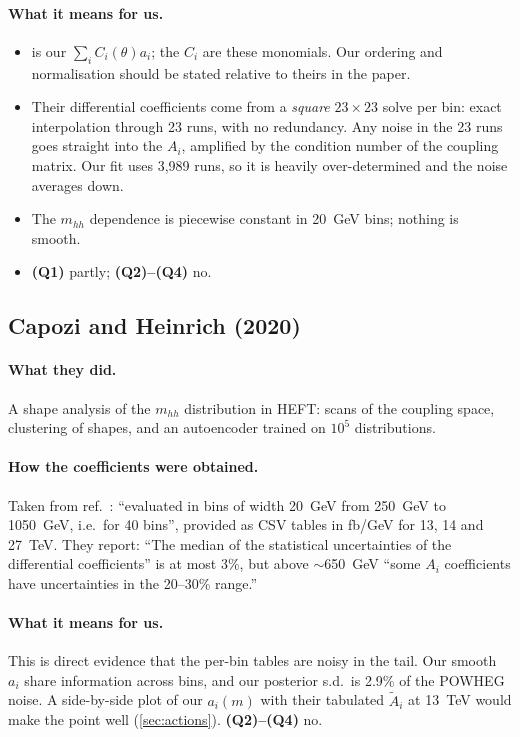 \paragraph{What it means for us.}
\begin{itemize}
  \item {} is our $\sum_i C_i(\theta)a_i$; the $C_i$ are these monomials.
    Our ordering and normalisation should be stated relative to theirs in the paper.
  \item Their differential coefficients come from a \emph{square} $23\times23$ solve per bin:
    exact interpolation through 23 runs, with no redundancy. Any noise in the 23 runs goes
    straight into the $A_i$, amplified by the condition number of the coupling matrix. Our
    fit uses 3,989 runs, so it is heavily over-determined and the noise averages down.
  \item The $m_{hh}$ dependence is piecewise constant in 20~GeV bins; nothing is smooth.
  \item \textbf{(Q1)} partly; \textbf{(Q2)--(Q4)} no.
\end{itemize}

\subsection{Capozi and Heinrich (2020) \cite{Capozi2020}}

\paragraph{What they did.} A shape analysis of the $m_{hh}$ distribution in HEFT: scans of
the coupling space, clustering of shapes, and an autoencoder trained on $10^5$
distributions.

\paragraph{How the coefficients were obtained.} Taken from ref.~\cite{Buchalla2018}:
``evaluated in bins of width 20~GeV from 250~GeV to 1050~GeV, i.e.\ for 40 bins'', provided as
CSV tables in fb/GeV for 13, 14 and 27~TeV. They report: ``The median of the statistical
uncertainties of the differential coefficients'' is at most 3\%, but above $\sim$650~GeV
``some $A_i$ coefficients have uncertainties in the 20--30\% range.''

\paragraph{What it means for us.} This is direct evidence that the per-bin tables are noisy
in the tail. Our smooth $a_i$ share information across bins, and our posterior s.d.\ is
2.9\% of the POWHEG noise. A side-by-side plot of our $a_i(m)$ with their tabulated
$\tilde A_i$ at 13~TeV would make the point well (\cref{sec:actions}).
\textbf{(Q2)--(Q4)} no.

